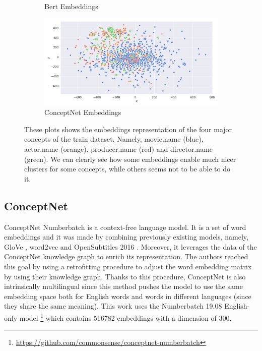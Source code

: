 \documentclass[11pt,a4paper]{article}
\begin{document}
\begin{figure}[!ht]
\begin{subfigure}{0.5\linewidth}
  \caption{Bert Embeddings}
  \label{fig:sfig2}
\end{subfigure}%
\begin{subfigure}{0.5\linewidth}
  \centering
  \includegraphics[width=\linewidth]{img/conceptnet-embeddings.png}
  \caption{ConceptNet Embeddings}
  \label{fig:sfig2}
\end{subfigure}
\caption{These plots shows the embeddings representation of the four major concepts of the train dataset. Namely, movie.name (blue), actor.name (orange), producer.name (red) and director.name (green). We can clearly see how some embeddings enable much nicer clusters for some concepts, while others seems not to be able to do it.}
\label{fig:fig}
\end{figure}

\subsection{ConceptNet}
ConceptNet Numberbatch \cite{speer2017conceptnet} is a context-free language model. It is a set of word embeddings and it was made by combining previously existing models, namely, GloVe \cite{pennington2014glove}, word2vec \cite{mikolov2013efficient} and OpenSubtitles 2016 \cite{Lison2016OpenSubtitles2016EL}. Moreover, it leverages the data of the ConceptNet knowledge graph to enrich its representation. The authors reached this goal by using a retrofitting procedure to adjust the word embedding matrix by using their knowledge graph. Thanks to this procedure, ConceptNet is also intrinsically multilingual since this method pushes the model to use the same embedding space both for English words and words in different languages (since they share the same meaning).  This work uses the Numberbatch 19.08 English-only model \footnote{\url{https://github.com/commonsense/conceptnet-numberbatch}} which contains 516782 embeddings with a dimension of 300.
\end{document}
